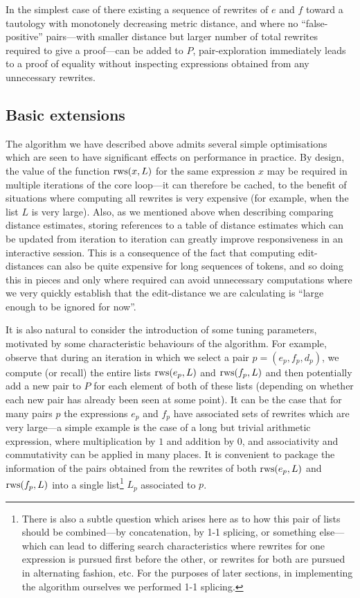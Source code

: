 \documentclass[12pt]{easychair}
\begin{document}
In the simplest case of there existing a sequence of rewrites of $e$ and $f$ toward a tautology with monotonely decreasing metric distance, and where no ``false-positive'' pairs---with smaller distance but larger number of total rewrites required to give a proof---can be added to $P$, pair-exploration immediately leads to a proof of equality without inspecting expressions obtained from any unnecessary rewrites.

\subsection{Basic extensions}

The algorithm we have described above admits several simple optimisations which are seen to have significant effects on performance in practice. By design, the value of the function $\operatorname{rws}(x, L)$ for the same expression $x$ may be required in multiple iterations of the core loop---it can therefore be cached, to the benefit of situations where computing all rewrites is very expensive (for example, when the list $L$ is very large). Also, as we mentioned above when describing comparing distance estimates, storing references to a table of distance estimates which can be updated from iteration to iteration can greatly improve responsiveness in an interactive session. This is a consequence of the fact that computing edit-distances can also be quite expensive for long sequences of tokens, and so doing this in pieces and only where required can avoid unnecessary computations where we very quickly establish that the edit-distance we are calculating is ``large enough to be ignored for now''.

It is also natural to consider the introduction of some tuning parameters, motivated by some characteristic behaviours of the algorithm. For example, observe that during an iteration in which we select a pair $p = (e_p, f_p, d_p)$, we compute (or recall) the entire lists $\operatorname{rws}(e_p, L)$ and $\operatorname{rws}(f_p, L)$ and then potentially add a new pair to $P$ for each element of both of these lists (depending on whether each new pair has already been seen at some point). It can be the case that for many pairs $p$ the expressions $e_p$ and $f_p$ have associated sets of rewrites which are very large---a simple example is the case of a long but trivial arithmetic expression, where multiplication by $1$ and addition by $0$, and associativity and commutativity can be applied in many places. It is convenient to package the information of the pairs obtained from the rewrites of both $\operatorname{rws}(e_p, L)$ and $\operatorname{rws}(f_p, L)$ into a single list\footnote{There is also a subtle question which arises here as to how this pair of lists should be combined---by concatenation, by 1-1 splicing, or something else---which can lead to differing search characteristics where rewrites for one expression is pursued first before the other, or rewrites for both are pursued in alternating fashion, etc. For the purposes of later sections, in implementing the algorithm ourselves we performed 1-1 splicing.} $L_p$ associated to $p$.
\end{document}
